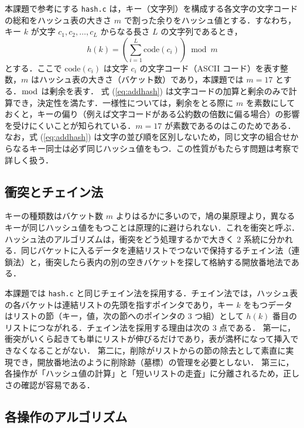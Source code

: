 本課題で参考にする {\tt hash.c} は，キー（文字列）を構成する各文字の文字コードの総和をハッシュ表の大きさ $m$ で割った余りをハッシュ値とする．すなわち，キー $k$ が文字 $c_1, c_2, \ldots, c_L$ からなる長さ $L$ の文字列であるとき，
\begin{equation}\label{eq:addhash}
h(k) = \left( \sum_{i=1}^{L} \mathrm{code}(c_i) \right) \bmod m
\end{equation}
とする．ここで $\mathrm{code}(c_i)$ は文字 $c_i$ の文字コード（ASCII コード）を表す整数，$m$ はハッシュ表の大きさ（バケット数）であり，本課題では $m = 17$ とする．$\bmod$ は剰余を表す．
式 (\ref{eq:addhash}) は文字コードの加算と剰余のみで計算でき，決定性を満たす．一様性については，剰余をとる際に $m$ を素数にしておくと，キーの偏り（例えば文字コードがある公約数の倍数に偏る場合）の影響を受けにくいことが知られている．$m=17$ が素数であるのはこのためである．なお，式 (\ref{eq:addhash}) は文字の並び順を区別しないため，同じ文字の組合せからなるキー同士は必ず同じハッシュ値をもつ．この性質がもたらす問題は考察で詳しく扱う．

\subsection{衝突とチェイン法}

キーの種類数はバケット数 $m$ よりはるかに多いので，鳩の巣原理より，異なるキーが同じハッシュ値をもつことは原理的に避けられない．これを衝突と呼ぶ．ハッシュ法のアルゴリズムは，衝突をどう処理するかで大きく 2 系統に分かれる．同じバケットに入るデータを連結リストでつないで保持するチェイン法（連鎖法）と，衝突したら表内の別の空きバケットを探して格納する開放番地法である．

本課題では {\tt hash.c} と同じチェイン法を採用する．チェイン法では，ハッシュ表の各バケットは連結リストの先頭を指すポインタであり，キー $k$ をもつデータはリストの節（キー，値，次の節へのポインタの 3 つ組）として $h(k)$ 番目のリストにつながれる．チェイン法を採用する理由は次の 3 点である．
第一に，衝突がいくら起きても単にリストが伸びるだけであり，表が満杯になって挿入できなくなることがない．
第二に，削除がリストからの節の除去として素直に実現でき，開放番地法のように削除跡（墓標）の管理を必要としない．
第三に，各操作が「ハッシュ値の計算」と「短いリストの走査」に分離されるため，正しさの確認が容易である．

\subsection{各操作のアルゴリズム}

